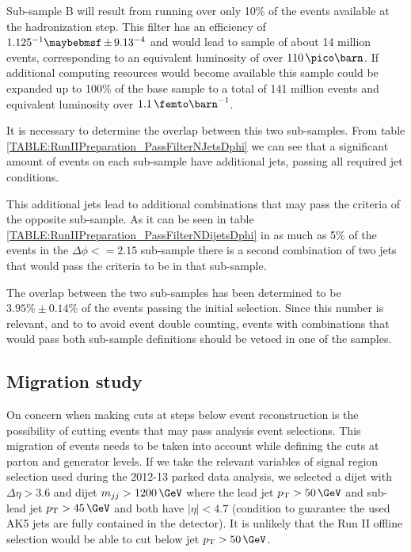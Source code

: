 Sub-sample B will result from running over only 10\% of the events available at the hadronization step. This filter has an efficiency of $1.125 \time 10^{-1} \pm 9.13 \time 10^{-4}$  and would lead to sample of about 14 million events, corresponding to an equivalent luminosity of over $110\,\pico\barn$. If additional computing resources would become available this sample could be expanded up to 100\% of the base sample to a total of 141 million events and equivalent luminosity over $1.1\,\femto\barn^{-1}$.

It is necessary to determine the overlap between this two sub-samples. From table \ref{TABLE:RunIIPreparation_PassFilterNJetsDphi} we can see that a significant amount of events on each sub-sample have additional jets, passing all required jet conditions. 



This additional jets lead to additional combinations that may pass the criteria of the opposite sub-sample. As it can be seen in table \ref{TABLE:RunIIPreparation_PassFilterNDijetsDphi} in as much as 5\% of the events in the $\Delta\phi<=2.15$ sub-sample there is a second combination of two jets that would pass the criteria to be in that sub-sample.



The overlap between the two sub-samples has been determined to be $3.95\% \pm 0.14\%$ of the events passing the initial selection. Since this number is relevant, and to to avoid event double counting, events with combinations that would pass both sub-sample definitions should be vetoed in one of the samples.

\subsection{Migration study}
\label{SUBSECTION:RunIIPreparation_MigrationStudy}


On concern when making cuts at steps below event reconstruction is the possibility of cutting events that may pass analysis event selections. This migration of events needs to be taken into account while defining the cuts at parton and generator levels. If we take the relevant variables of signal region selection used during the 2012-13 parked data analysis, we selected a dijet with   $\Delta\eta>3.6$ and dijet $m_{jj}>1200\,\GeV$ where the lead jet $\pt > 50\,\GeV$ and sub-lead jet $\pt > 45\,\GeV$ and both have $|\eta|<4.7$ (condition to guarantee the used AK5 jets are fully contained in the detector). It is unlikely that the Run II offline selection would be able to cut below jet $\pt > 50\,\GeV$.

